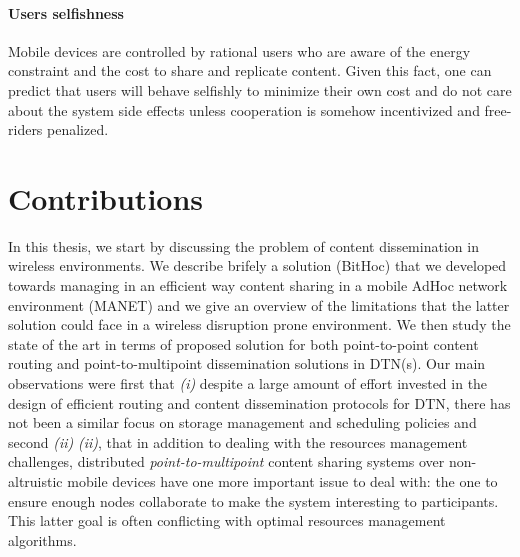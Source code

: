 \paragraph{Users selfishness}

Mobile devices are controlled by rational users who are aware of the energy constraint and the cost to share and replicate content. Given this fact, one can predict that users will behave selfishly to minimize their own cost and do not care about the system side effects unless cooperation is somehow incentivized and free-riders penalized. 

\section{Contributions}

In this thesis, we start by discussing the problem of content dissemination in wireless environments. We describe brifely a solution (BitHoc) that we developed towards managing in an efficient way content sharing in a mobile AdHoc network environment (MANET) and we give an overview of the limitations that the latter solution could face in a wireless disruption prone environment. We then study the state of the art in terms of proposed solution for both point-to-point content routing and point-to-multipoint dissemination solutions in DTN(s). Our main observations were first that \emph{(i)} despite a large amount of effort invested in the design of efficient routing and content dissemination protocols for DTN, there has not been a similar focus on storage management and scheduling policies and second \emph{(ii)} \emph{(ii)}, that in addition to dealing with the resources management challenges, distributed \emph{point-to-multipoint} content sharing systems over non-altruistic mobile devices have one more important issue to deal with: the one to ensure enough nodes collaborate to make the system interesting to participants. This latter goal is often conflicting with optimal resources management algorithms. 

